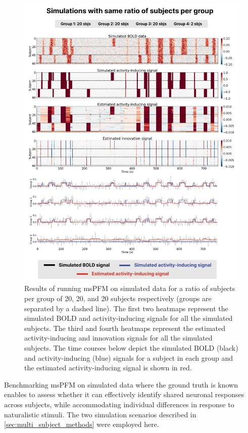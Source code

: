 \begin{figure}[!ht]
    \centering
    \includegraphics[width=0.8\linewidth]{figures/multi_subject/sim_same_ratio.png}
    \caption{Results of running msPFM on simulated data for a ratio of subjects
    per group of 20, 20, and 20 subjects respectively (groups are separated by a
    dashed line). The first two heatmaps represent the simulated BOLD and
    activity-inducing signals for all the simulated subjects. The third and
    fourth heatmaps represent the estimated activity-inducing and innovation
    signals for all the simulated subjects. The time courses below depict the
    simulated BOLD (black) and activity-inducing (blue) signals for a subject in
    each group and the estimated activity-inducing signal is shown in red.}
    \label{fig:simulations_same}
\end{figure}

Benchmarking msPFM on simulated data where the ground truth is known enables to
assess whether it can effectively identify shared neuronal responses across
subjects, while accommodating individual differences in response to naturalistic
stimuli. The two simulation scenarios described in
\cref{sec:multi_subject_methods} were employed here.

